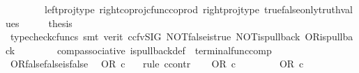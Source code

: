 \begin{isabellebody}
\ \ \ \ \ \ \ \ left{\isacharunderscore}{\kern0pt}proj{\isacharunderscore}{\kern0pt}type\ right{\isacharunderscore}{\kern0pt}coproj{\isacharunderscore}{\kern0pt}cfunc{\isacharunderscore}{\kern0pt}coprod\ right{\isacharunderscore}{\kern0pt}proj{\isacharunderscore}{\kern0pt}type\ true{\isacharunderscore}{\kern0pt}false{\isacharunderscore}{\kern0pt}only{\isacharunderscore}{\kern0pt}truth{\isacharunderscore}{\kern0pt}values{\isacharparenright}{\kern0pt}\isanewline
\ \ \isamarkupfalse%
\ \isamarkupfalse%
\ {\isacharquery}{\kern0pt}thesis\ \isanewline
\ \ \ \ \isamarkupfalse%
\ {\isacharparenleft}{\kern0pt}typecheck{\isacharunderscore}{\kern0pt}cfuncs{\isacharcomma}{\kern0pt}\ smt\ {\isacharparenleft}{\kern0pt}verit{\isacharcomma}{\kern0pt}\ ccfv{\isacharunderscore}{\kern0pt}SIG{\isacharparenright}{\kern0pt}\ NOT{\isacharunderscore}{\kern0pt}false{\isacharunderscore}{\kern0pt}is{\isacharunderscore}{\kern0pt}true\ NOT{\isacharunderscore}{\kern0pt}is{\isacharunderscore}{\kern0pt}pullback\ OR{\isacharunderscore}{\kern0pt}is{\isacharunderscore}{\kern0pt}pullback\isanewline
\ \ \ \ \ \ \ \ comp{\isacharunderscore}{\kern0pt}associative{}\ is{\isacharunderscore}{\kern0pt}pullback{\isacharunderscore}{\kern0pt}def\ \ terminal{\isacharunderscore}{\kern0pt}func{\isacharunderscore}{\kern0pt}comp{\isacharparenright}{\kern0pt}\isanewline
{}\isamarkupfalse%
%
\endisatagproof
{\isafoldproof}%
%
\isadelimproof
\isanewline
%
\endisadelimproof
\isanewline
{}\isamarkupfalse%
\ OR{\isacharunderscore}{\kern0pt}false{\isacharunderscore}{\kern0pt}false{\isacharunderscore}{\kern0pt}is{\isacharunderscore}{\kern0pt}false{\isacharcolon}{\kern0pt}\isanewline
\ \ {\isachardoublequoteopen}OR\ {\isasymcirc}\isactrlsub c\ {\isasymlangle}{\isasymf}{\isacharcomma}{\kern0pt}{\isasymf}{\isasymrangle}\ {\isacharequal}{\kern0pt}\ {\isasymf}{\isachardoublequoteclose}\isanewline
%
\isadelimproof
%
\endisadelimproof
%
\isatagproof
{}\isamarkupfalse%
{\isacharparenleft}{\kern0pt}rule\ ccontr{\isacharparenright}{\kern0pt}\isanewline
\ \ \isamarkupfalse%
\ {\isachardoublequoteopen}OR\ {\isasymcirc}\isactrlsub c\ {\isasymlangle}{\isasymf}{\isacharcomma}{\kern0pt}{\isasymf}{\isasymrangle}\ {\isasymnoteq}\ {\isasymf}{\isachardoublequoteclose}\isanewline
\ \ \isamarkupfalse%
\ \isamarkupfalse%
\ {\isachardoublequoteopen}OR\ {\isasymcirc}\isactrlsub c\ {\isasymlangle}{\isasymf}{\isacharcomma}{\kern0pt}{\isasymf}{\isasymrangle}\ {\isacharequal}{\kern0pt}\ {\isasymt}{\isachardoublequoteclose}\isanewline

\end{isabellebody}
